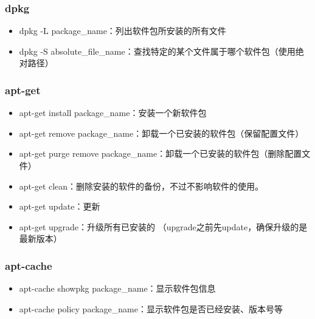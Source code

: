 \documentclass[letterpaper,10pt,english]{sphinxmanual}
\begin{document}
\subsubsection{dpkg}
\label{\detokenize{linux/02_more:dpkg}}\begin{itemize}
\item {} 
dpkg -L package\_name：列出软件包所安装的所有文件

\item {} 
dpkg -S absolute\_file\_name：查找特定的某个文件属于哪个软件包（使用绝对路径）

\end{itemize}


\subsubsection{apt-get}
\label{\detokenize{linux/02_more:apt-get}}\begin{itemize}
\item {} 
apt-get install package\_name：安装一个新软件包

\item {} 
apt-get remove package\_name：卸载一个已安装的软件包（保留配置文件）

\item {} 
apt-get \textendash{}purge remove package\_name：卸载一个已安装的软件包（删除配置文件）

\item {} 
apt-get clean：删除安装的软件的备份，不过不影响软件的使用。

\item {} 
apt-get update：更新 

\item {} 
apt-get upgrade：升级所有已安装的  （upgrade之前先update，确保升级的是最新版本）

\end{itemize}


\subsubsection{apt-cache}
\label{\detokenize{linux/02_more:apt-cache}}\begin{itemize}
\item {} 
apt-cache showpkg package\_name：显示软件包信息

\item {} 
apt-cache policy package\_name：显示软件包是否已经安装、版本号等

\end{itemize}
\end{document}
